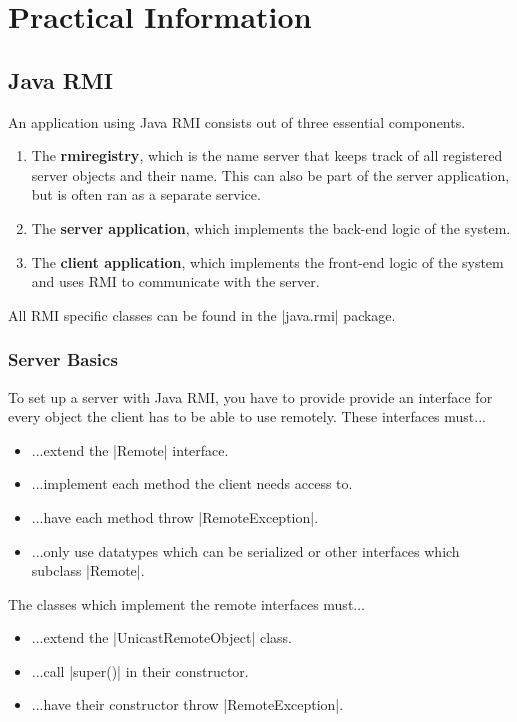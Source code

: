 \documentclass[a4paper]{article}
\begin{document}
\newpage

\section{Practical Information}

\subsection{Java RMI}

An application using Java RMI consists out of three essential components.

\begin{enumerate}
\item The \textbf{rmiregistry}, which is the name server that keeps track of all registered server objects and their name. This can also be part of the server application, but is often ran as a separate service.
\item The \textbf{server application}, which implements the back-end logic of the system.
\item The \textbf{client application}, which implements the front-end logic of the system and uses RMI to communicate with the server.
\end{enumerate}

All RMI specific classes can be found in the |java.rmi| package.

\subsubsection{Server Basics}

To set up a server with Java RMI, you have to provide provide an interface for every object the client has to be able to use remotely. These interfaces must...

\begin{itemize}
\item ...extend the |Remote| interface.
\item ...implement each method the client needs access to.
\item ...have each method throw |RemoteException|.
\item ...only use datatypes which can be serialized or other interfaces which subclass |Remote|.
\end{itemize}

The classes which implement the remote interfaces must...

\begin{itemize}
\item ...extend the |UnicastRemoteObject| class.
\item ...call |super()| in their constructor.
\item ...have their constructor throw |RemoteException|.
\end{itemize}
\end{document}

